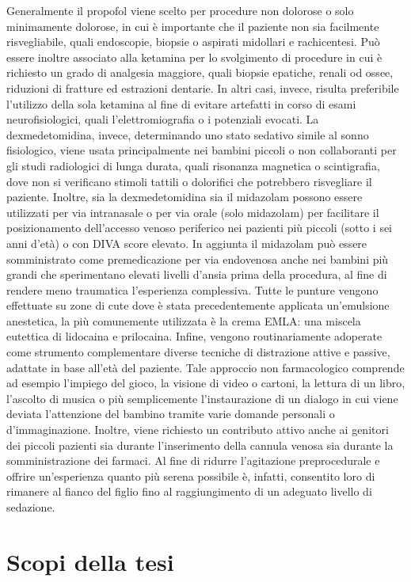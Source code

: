 Generalmente il propofol viene scelto per procedure non dolorose o solo minimamente dolorose, in cui è importante che il paziente non sia facilmente risvegliabile, quali endoscopie, biopsie o aspirati midollari e rachicentesi. Può essere inoltre associato alla ketamina per lo svolgimento di procedure in cui è richiesto un grado di analgesia maggiore, quali biopsie epatiche, renali od ossee, riduzioni di fratture ed estrazioni dentarie. In altri casi, invece, risulta preferibile l'utilizzo della sola ketamina al fine di evitare artefatti in corso di esami neurofisiologici, quali l'elettromiografia o i potenziali evocati. La dexmedetomidina, invece, determinando uno stato sedativo simile al sonno fisiologico, viene usata principalmente nei bambini piccoli o non collaboranti per gli studi radiologici di lunga durata, quali risonanza magnetica o scintigrafia, dove non si verificano stimoli tattili o dolorifici che potrebbero risvegliare il paziente. Inoltre, sia la dexmedetomidina sia il midazolam possono essere utilizzati per via intranasale o per via orale (solo midazolam) per facilitare il posizionamento dell'accesso venoso periferico nei pazienti più piccoli (sotto i sei anni d'età) o con DIVA score elevato. In aggiunta il midazolam può essere somministrato come premedicazione per via endovenosa anche nei bambini più grandi che sperimentano elevati livelli d'ansia prima della procedura, al fine di rendere meno traumatica l'esperienza complessiva. Tutte le punture vengono effettuate su zone di cute dove è stata precedentemente applicata un'emulsione anestetica, la più comunemente utilizzata è la crema EMLA: una miscela eutettica di lidocaina e prilocaina. Infine, vengono routinariamente adoperate come strumento complementare diverse tecniche di distrazione attive e passive, adattate in base all'età del paziente. Tale approccio non farmacologico comprende ad esempio l'impiego del gioco, la visione di video o cartoni, la lettura di un libro, l'ascolto di musica o più semplicemente l'instaurazione di un dialogo in cui viene deviata l'attenzione del bambino tramite varie domande personali o d'immaginazione. Inoltre, viene richiesto un contributo attivo anche ai genitori dei piccoli pazienti sia durante l'inserimento della cannula venosa sia durante la somministrazione dei farmaci. Al fine di ridurre l'agitazione preprocedurale e offrire un'esperienza quanto più serena possibile è, infatti, consentito loro di rimanere al fianco del figlio fino al raggiungimento di un adeguato livello di sedazione. 

\section{Scopi della tesi}

